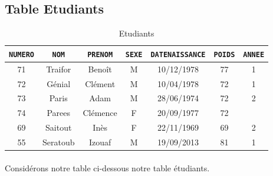 \documentclass{report}
\begin{document}
\subsection{Table Etudiants}

\begin{table}[H]
	\center
	\begin{tabular}{|c|c|c|c|c|c|c|}
		\hline
		\verb+NUMERO+ & \verb+NOM+ & \verb+PRENOM+ & \verb+SEXE+ & \verb+DATENAISSANCE+ & \verb+POIDS+ & \verb+ANNEE+ \\
		\hline
		71 & Traifor & Benoît & M & 10/12/1978 & 77 & 1 \\
		\hline
		72 & Génial & Clément & M & 10/04/1978 & 72 & 1 \\
		\hline
		73 & Paris & Adam & M & 28/06/1974 & 72 & 2 \\
		\hline
		74 & Parees & Clémence & F & 20/09/1977 & 72 & \\
		\hline
		69 & Saitout & Inès & F & 22/11/1969 & 69 & 2 \\
		\hline
		55 & Seratoub & Izouaf & M & 19/09/2013 & 81 & 1 \\
		\hline
	\end{tabular}
	\caption{Etudiants}
\end{table}

\paragraph{}Considérons notre table ci-dessous notre table étudiants.
\end{document}
